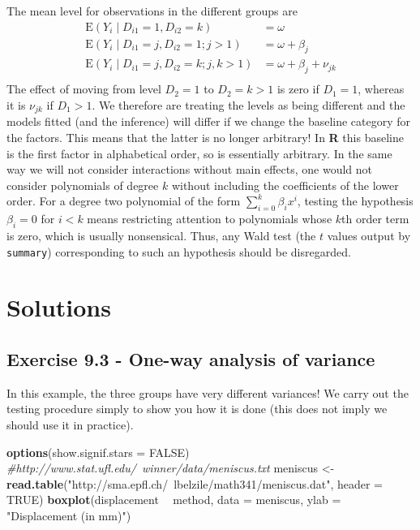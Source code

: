\documentclass[]{book}
\newenvironment{Shaded}{\begin{snugshade}}{\end{snugshade}}
\newcommand{\CommentTok}[1]{\textcolor[rgb]{0.56,0.35,0.01}{\textit{#1}}}
\newcommand{\DataTypeTok}[1]{\textcolor[rgb]{0.13,0.29,0.53}{#1}}
\newcommand{\KeywordTok}[1]{\textcolor[rgb]{0.13,0.29,0.53}{\textbf{#1}}}
\newcommand{\NormalTok}[1]{#1}
\newcommand{\OperatorTok}[1]{\textcolor[rgb]{0.81,0.36,0.00}{\textbf{#1}}}
\newcommand{\OtherTok}[1]{\textcolor[rgb]{0.56,0.35,0.01}{#1}}
\newcommand{\StringTok}[1]{\textcolor[rgb]{0.31,0.60,0.02}{#1}}
\theoremstyle{definition}
\theoremstyle{definition}
\theoremstyle{definition}
\theoremstyle{remark}
\begin{document}
The mean level for observations in the different groups are
\begin{align*}
\mathrm{E}(Y_i \mid D_{i1}=1, D_{i2}=k) &= \omega \\
\mathrm{E}(Y_i \mid D_{i1}=j, D_{i2}=1; j > 1) &= \omega + \beta_j \\
\mathrm{E}(Y_i \mid D_{i1}=j, D_{i2}=k; j, k > 1) &= \omega + \beta_j + \nu_{jk} \\
\end{align*}
The effect of moving from level \(D_{2}=1\) to \(D_{2}=k>1\) is zero if \(D_{1}=1\), whereas it is \(\nu_{jk}\) if \(D_{1}>1\). We therefore are treating the levels as being different and the models fitted (and the inference) will differ if we change the baseline category for the factors. This means that the latter is no longer arbitrary!
In \textbf{R} this baseline is the first factor in alphabetical order, so is essentially arbitrary. In the same way we will not consider interactions without main effects, one would not consider polynomials of degree \(k\) without including the coefficients of the lower order. For a degree two polynomial of the form \(\sum_{i=0}^k \beta_ix^i\), testing the hypothesis \(\beta_i=0\) for \(i < k\) means restricting attention to polynomials whose \(k\)th order term is zero, which is usually nonsensical. Thus, any Wald test (the \(t\) values output by \texttt{summary}) corresponding to such an hypothesis should be disregarded.

\hypertarget{solutions-4}{%
\section{Solutions}\label{solutions-4}}

\hypertarget{exercise-9.3---one-way-analysis-of-variance}{%
\subsection{Exercise 9.3 - One-way analysis of variance}\label{exercise-9.3---one-way-analysis-of-variance}}

In this example, the three groups have very different variances! We carry out the testing procedure simply to show you how it is done (this does not imply we should use it in practice).

\begin{Shaded}
\begin{Highlighting}[]
\KeywordTok{options}\NormalTok{(}\DataTypeTok{show.signif.stars =} \OtherTok{FALSE}\NormalTok{)}
\CommentTok{#http://www.stat.ufl.edu/~winner/data/meniscus.txt}
\NormalTok{meniscus <-}\StringTok{ }\KeywordTok{read.table}\NormalTok{(}\StringTok{"http://sma.epfl.ch/~lbelzile/math341/meniscus.dat"}\NormalTok{, }\DataTypeTok{header =} \OtherTok{TRUE}\NormalTok{)}
\KeywordTok{boxplot}\NormalTok{(displacement }\OperatorTok{~}\StringTok{ }\NormalTok{method, }\DataTypeTok{data =}\NormalTok{ meniscus, }\DataTypeTok{ylab =} \StringTok{"Displacement (in mm)"}\NormalTok{)}
\end{Highlighting}
\end{Shaded}
\end{document}
